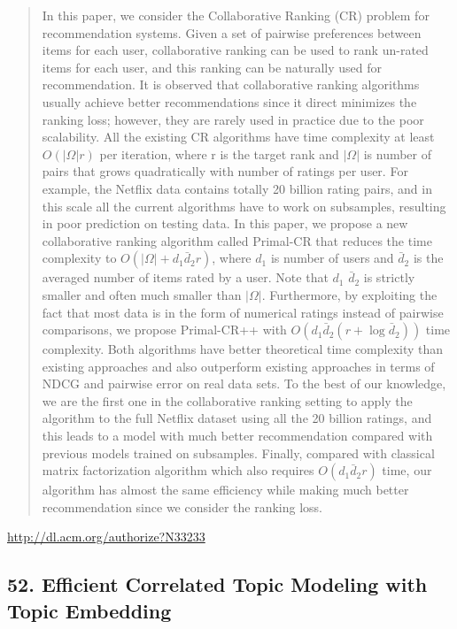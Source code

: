 \documentclass{article}
\begin{document}
\begin{quote}
In this paper, we consider the Collaborative Ranking (CR) problem for recommendation systems. Given a set of pairwise preferences between items for each user, collaborative ranking can be used to rank un-rated items for each user, and this ranking can be naturally used for recommendation. It is observed that collaborative ranking algorithms usually achieve better recommendations since it direct minimizes the ranking loss; however, they are rarely used in practice due to the poor scalability. All the existing CR algorithms have time complexity at least $O(|\Omega|r)$ per iteration, where r is the target rank and $|\Omega|$ is number of pairs that grows quadratically with number of ratings per user. For example, the Netflix data contains totally 20 billion rating pairs, and in this scale all the current algorithms have to work on subsamples, resulting in poor prediction on testing data. In this paper, we propose a new collaborative ranking algorithm called Primal-CR that reduces the time complexity to $O(|\Omega|+d_1 \bar{d}_2 r)$, where $d_1$ is number of users and $\bar{d}_2$ is the averaged number of items rated by a user. Note that $d_1$ $\bar{d}_2$ is strictly smaller and often much smaller than $|\Omega|$. Furthermore, by exploiting the fact that most data is in the form of numerical ratings instead of pairwise comparisons, we propose Primal-CR++ with $O(d_1\bar{d}_2 (r+ \log \bar{d}_2 ))$ time complexity. Both algorithms have better theoretical time complexity than existing approaches and also outperform existing approaches in terms of NDCG and pairwise error on real data sets. To the best of our knowledge, we are the first one in the collaborative ranking setting to apply the algorithm to the full Netflix dataset using all the 20 billion ratings, and this leads to a model with much better recommendation compared with previous models trained on subsamples. Finally, compared with classical matrix factorization algorithm which also requires $O(d_1 \bar{d}_2 r)$ time, our algorithm has almost the same efficiency while making much better recommendation since we consider the ranking loss.
\end{quote}

\href{http://dl.acm.org/authorize?N33233}{http://dl.acm.org/authorize?N33233}

\subsection{52. Efficient Correlated Topic Modeling with Topic Embedding}
\end{document}
